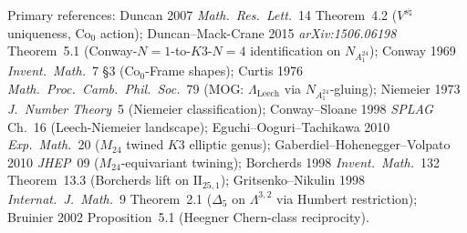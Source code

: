 \begin{remark}
Primary references: Duncan 2007 \emph{Math.\ Res.\ Lett.}~14
Theorem~4.2 ($V^{s\natural}$ uniqueness, $\mathrm{Co}_0$ action);
Duncan--Mack-Crane 2015 \emph{arXiv:1506.06198} Theorem~5.1
(Conway-$N=1$-to-$K3$-$N=4$ identification on $N_{A_1^{24}}$);
Conway 1969 \emph{Invent.\ Math.}~7 \S3
($\mathrm{Co}_0$-Frame shapes); Curtis 1976 \emph{Math.\ Proc.\
Camb.\ Phil.\ Soc.}~79 (MOG: $\Lambda_{\mathrm{Leech}}$ via
$N_{A_1^{24}}$-gluing); Niemeier 1973 \emph{J.\ Number Theory}~5
(Niemeier classification); Conway--Sloane 1998 \emph{SPLAG} Ch.~16
(Leech-Niemeier landscape); Eguchi--Ooguri--Tachikawa 2010
\emph{Exp.\ Math.}~20 ($M_{24}$ twined $K3$ elliptic genus);
Gaberdiel--Hohenegger--Volpato 2010 \emph{JHEP}~09
($M_{24}$-equivariant twining); Borcherds 1998 \emph{Invent.\
Math.}~132 Theorem~13.3 (Borcherds lift on $\mathrm{II}_{25,1}$);
Gritsenko--Nikulin 1998 \emph{Internat.\ J.\ Math.}~9 Theorem~2.1
($\Delta_5$ on $\Lambda^{3,2}$ via Humbert restriction);
Bruinier 2002 Proposition~5.1 (Heegner Chern-class reciprocity).
\end{remark}

